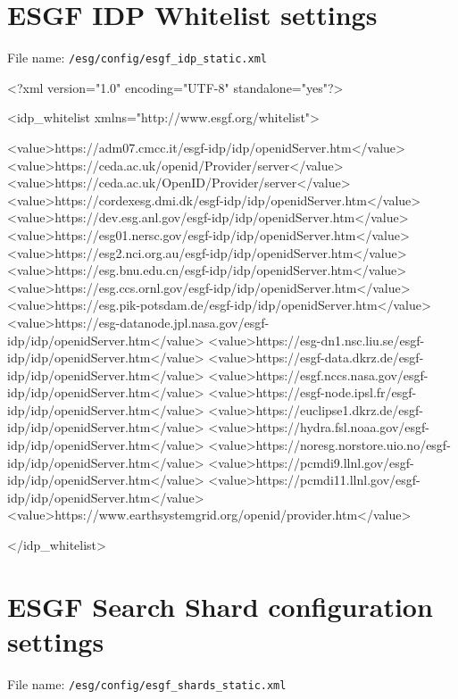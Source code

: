 \section{ESGF IDP Whitelist settings}
File name: \texttt{/esg/config/esgf\_idp\_static.xml}
\begin{tiny}
\begin{verbatimtab}[4]
<?xml version="1.0" encoding="UTF-8" standalone="yes"?>

<idp_whitelist xmlns="http://www.esgf.org/whitelist">

	<value>https://adm07.cmcc.it/esgf-idp/idp/openidServer.htm</value>
	<value>https://ceda.ac.uk/openid/Provider/server</value>
	<value>https://ceda.ac.uk/OpenID/Provider/server</value>
	<value>https://cordexesg.dmi.dk/esgf-idp/idp/openidServer.htm</value>
	<value>https://dev.esg.anl.gov/esgf-idp/idp/openidServer.htm</value>
	<value>https://esg01.nersc.gov/esgf-idp/idp/openidServer.htm</value>
	<value>https://esg2.nci.org.au/esgf-idp/idp/openidServer.htm</value>
	<value>https://esg.bnu.edu.cn/esgf-idp/idp/openidServer.htm</value>
	<value>https://esg.ccs.ornl.gov/esgf-idp/idp/openidServer.htm</value>
	<value>https://esg.pik-potsdam.de/esgf-idp/idp/openidServer.htm</value>
	<value>https://esg-datanode.jpl.nasa.gov/esgf-idp/idp/openidServer.htm</value>
	<value>https://esg-dn1.nsc.liu.se/esgf-idp/idp/openidServer.htm</value>
	<value>https://esgf-data.dkrz.de/esgf-idp/idp/openidServer.htm</value>
	<value>https://esgf.nccs.nasa.gov/esgf-idp/idp/openidServer.htm</value>
	<value>https://esgf-node.ipsl.fr/esgf-idp/idp/openidServer.htm</value>
	<value>https://euclipse1.dkrz.de/esgf-idp/idp/openidServer.htm</value>
	<value>https://hydra.fsl.noaa.gov/esgf-idp/idp/openidServer.htm</value>
	<value>https://noresg.norstore.uio.no/esgf-idp/idp/openidServer.htm</value>
	<value>https://pcmdi9.llnl.gov/esgf-idp/idp/openidServer.htm</value>
	<value>https://pcmdi11.llnl.gov/esgf-idp/idp/openidServer.htm</value>
	<value>https://www.earthsystemgrid.org/openid/provider.htm</value>

</idp_whitelist>
\end{verbatimtab}
\end{tiny}
\section{ESGF Search Shard configuration settings}
File name: \texttt{/esg/config/esgf\_shards\_static.xml}

